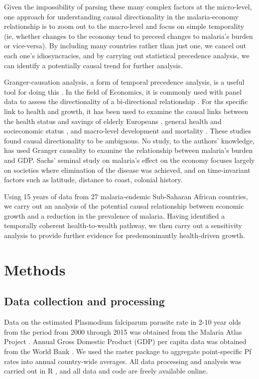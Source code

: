 \documentclass[9pt,twocolumn,twoside,lineno]{pnas-new}
\begin{document}
Given the impossibility of parsing these many complex factors at the micro-level, one approach for understanding causal directionality in the malaria-economy relationship is to zoom out to the macro-level and focus on simple temporality (ie, whether changes to the economy tend to preceed changes to malaria’s burden or vice-versa). By including many countries rather than just one, we cancel out each one’s idiosyncracies, and by carrying out statistical precedence analysis, we can identify a potentially causal trend for further analysis. 

Granger-causation analysis, a form of temporal precedence analysis, is a useful tool for doing this \cite{Granger_undated-wn, Molenaar2018-ss, Koller2016-rv, Granger1896-di, Clarke_JA2016-ik}. In the field of Economics, it is commonly used with panel data to assess the directionality of a bi-directional relationship \cite{Law_2013, Joerding1986}. For ths specific link to health and growth, it has been used to examine the causal links between the health status and savings of elderly Europeans \cite{Andreyeva2007-zq}, general health and socieconomic status \cite{Adams2003-wl}, and macro-level development and mortality \cite{Clarke_JA2016-ik}. These studies found causal directionality to be ambiguous. No study, to the authors’ knowledge, has used Granger causality to examine the relationship between malaria’s burden and GDP. Sachs' seminal study on malaria's effect on the economy \cite{Sachs2002-ig} focuses largely on societies where elimination of the disease was achieved, and on time-invariant factors such as latitude, distance to coast, colonial history.

Using 15 years of data from 27 malaria-endemic Sub-Saharan African countries, we carry out an analysis of the potential causal relationship between economic growth and a reduction in the prevalence of malaria. Having identified a temporally coherent health-to-wealth pathway, we then carry out a sensitivity analysis to provide further evidence for predemoninantly health-driven growth.

\section*{Methods}

\subsection*{Data collection and processing}

Data on the estimated Plasmodium falciparum parasite rate in 2-10 year olds from the period from 2000 through 2015 was obtained from the Malaria Atlas Project \cite{Hay_2006, Guerra_2007}. Annual Gross Domestic Product (GDP) per capita data was obtained from the World Bank \cite{worldbank}. We used the raster package \cite{raster} to aggregate point-specific Pf rates into annual country-wide averages. All data processing and analysis was carried out in R \cite{rr}, and all data and code are freely available online.
\end{document}
